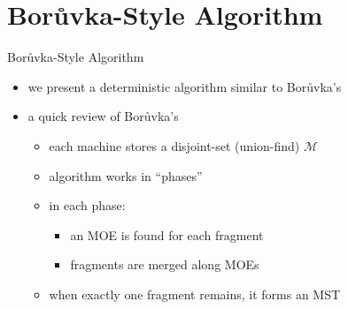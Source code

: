 \section{Bor\r{u}vka-Style Algorithm}
\begin{frame}{Bor\r{u}vka-Style Algorithm}
    \begin{itemize}
        \item we present a deterministic algorithm similar to Bor\r{u}vka's
        \item a quick review of Bor\r{u}vka's
              \begin{itemize}
                  \item each machine stores a disjoint-set (union-find) $\mathcal{M}$
                  \item algorithm works in ``phases''
                  \item in each phase:
                        \begin{itemize}
                            \item an MOE is found for each fragment
                            \item fragments are merged along MOEs
                        \end{itemize}
                  \item when exactly \alert{one} fragment remains, it forms an MST
              \end{itemize}
    \end{itemize}
\end{frame}


